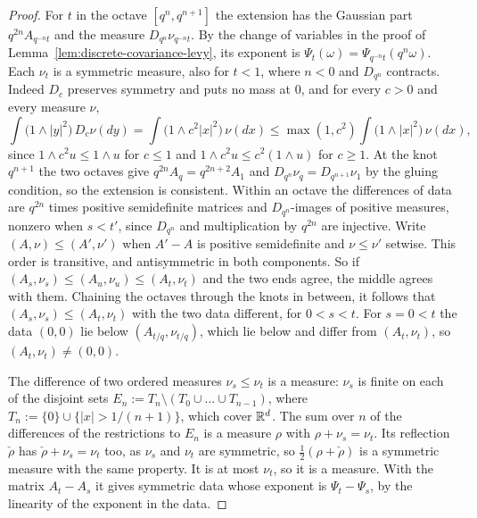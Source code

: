 \begin{proof}
For $t$ in the octave $[q^n, q^{n+1}]$ the extension has the Gaussian part $q^{2n}A_{q^{-n}t}$ and
the \Levy{} measure $D_{q^n}\nu_{q^{-n}t}$. By the change of variables in the proof of
Lemma~\ref{lem:discrete-covariance-levy}, its exponent is
$\Psi_t(\omega) = \Psi_{q^{-n}t}(q^n\omega)$. Each $\nu_t$ is a symmetric \Levy{} measure, also for
$t < 1$, where $n < 0$ and $D_{q^n}$ contracts. Indeed $D_c$ preserves symmetry and puts no mass at
$0$, and for every $c > 0$ and every \Levy{} measure $\nu$,
\[
  \int\bigl(1 \wedge |y|^2\bigr)\,D_c\nu(dy) = \int\bigl(1 \wedge c^2|x|^2\bigr)\,\nu(dx)
  \le \max(1, c^2)\int\bigl(1 \wedge |x|^2\bigr)\,\nu(dx),
\]
since $1 \wedge c^2u \le 1 \wedge u$ for $c \le 1$ and $1 \wedge c^2u \le c^2(1 \wedge u)$ for
$c \ge 1$. At the knot $q^{n+1}$ the two octaves give
$q^{2n}A_q = q^{2n+2}A_1$ and $D_{q^n}\nu_q = D_{q^{n+1}}\nu_1$ by the gluing condition, so the
extension is consistent. Within an octave the differences of data are $q^{2n}$ times positive
semidefinite matrices and $D_{q^n}$-images of positive measures, nonzero when $s < t'$, since
$D_{q^n}$ and multiplication by $q^{2n}$ are injective. Write $(A, \nu) \le (A', \nu')$ when
$A' - A$ is positive semidefinite and $\nu \le \nu'$ setwise. This order is transitive, and
antisymmetric in both components. So if $(A_s, \nu_s) \le (A_u, \nu_u) \le (A_t, \nu_t)$ and the
two ends agree, the middle agrees with them. Chaining the octaves through the knots in between,
it follows that $(A_s, \nu_s) \le (A_t, \nu_t)$ with the two data different, for $0 < s < t$. For
$s = 0 < t$ the data $(0, 0)$ lie below $(A_{t/q}, \nu_{t/q})$, which lie below and differ from
$(A_t, \nu_t)$, so $(A_t, \nu_t) \ne (0, 0)$.

The difference of two ordered \Levy{} measures $\nu_s \le \nu_t$ is a measure: $\nu_s$ is finite
on each of the disjoint sets $E_n := T_n \setminus (T_0 \cup \dots \cup T_{n-1})$, where
$T_n := \{0\} \cup \{|x| > 1/(n+1)\}$, which cover $\mathbb{R}^d$. The sum over $n$ of the differences of
the restrictions to $E_n$ is a measure $\rho$ with $\rho + \nu_s = \nu_t$. Its reflection
$\check\rho$ has $\check\rho + \nu_s = \nu_t$ too, as $\nu_s$ and $\nu_t$ are symmetric, so
$\tfrac12(\rho + \check\rho)$ is a symmetric measure with the same property. It is at most
$\nu_t$, so it is a \Levy{} measure. With the matrix $A_t - A_s$ it gives symmetric data whose
exponent is $\Psi_t - \Psi_s$, by the linearity of the exponent in the data.


\end{proof}
